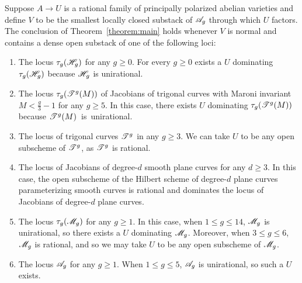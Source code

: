 \begin{theorem} \label{corollary:examples}
Suppose $A \rightarrow U$ is a rational family of principally polarized abelian varieties
and define $V$ to be the smallest locally closed substack of ${\mathscr A_g}$ through which $U$ factors.
The conclusion of Theorem~\ref{theorem:main} holds whenever $V$ is normal and contains a dense open substack of one of the following loci:
\begin{enumerate}
	       \item[\customlabel{big-hyperelliptic}{(a)}] The locus $\tau_g(\mathscr H_{g})$ for any $g \geq 0$.
		      For every $g \geq 0$ exists a $U$ dominating $\tau_g(\mathscr H_{g})$ because $\mathscr H_{g}$ is unirational.
               \item[\customlabel{big-maroni}{(b)}] The locus $\tau_g(\mathscr T^{g}(M))$ of Jacobians of trigonal curves with Maroni invariant $M < \frac{g}{3}-1$ for any $g \geq 5$. In this case, there exists $U$ dominating $\tau_g(\mathscr T^{g}(M))$ because \mbox{$\mathscr T^{g}(M)$ is unirational.}
		\item[\customlabel{big-trigonal}{(c)}] The locus of trigonal curves $\mathscr T^{g}$ in any $g \geq 3$.
We can take $U$ to be any open subscheme of $\mathscr T^{g}$, as $\mathscr T^{g}$ is rational.
               \item[\customlabel{big-plane}{(d)}] The locus of Jacobians of degree-$d$ smooth plane curves for any $d \geq 3$. In this case, the open subscheme of the Hilbert scheme
of degree-$d$ plane curves parameterizing smooth curves is rational and dominates the locus of Jacobians of degree-$d$ plane curves.
\item[\customlabel{big-mg}{(e)}] The locus $\tau_g({\mathscr M_g})$ for any $g \geq 1$. In this case, when $1 \leq g \leq 14$, ${\mathscr M_g}$ is unirational, so there exists a $U$ dominating ${\mathscr M_g}$. Moreover, when $3 \leq g \leq 6$, ${\mathscr M_g}$ is rational, and so we may take $U$ to be any open subscheme of ${\mathscr M_g}$.
               \item[\customlabel{big-ag}{(f)}] The locus ${\mathscr A_g}$ for any $g \geq 1$. When $1 \leq g \leq 5$, ${\mathscr A_g}$ is unirational, so such a $U$ exists.
\end{enumerate}
\end{theorem}
